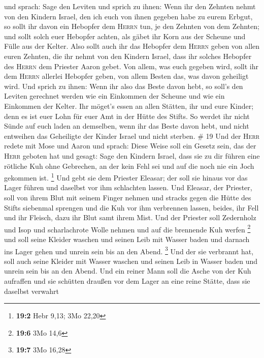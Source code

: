 und sprach:  Sage den Leviten und sprich zu ihnen: Wenn
ihr den Zehnten nehmt von den Kindern Israel, den ich euch von ihnen
gegeben habe zu eurem Erbgut, so sollt ihr davon ein Hebopfer dem
\textsc{Herrn} tun, je den Zehnten von dem Zehnten;  und
sollt solch euer Hebopfer achten, als gäbet ihr Korn aus der Scheune und
Fülle aus der Kelter.  Also sollt auch ihr das Hebopfer
dem \textsc{Herrn} geben von allen euren Zehnten, die ihr nehmt von den
Kindern Israel, dass ihr solches Hebopfer des \textsc{Herrn} dem
Priester Aaron gebet.  Von allem, was euch gegeben wird,
sollt ihr dem \textsc{Herrn} allerlei Hebopfer geben, von allem Besten
das, was davon geheiligt wird.  Und sprich zu ihnen: Wenn
ihr also das Beste davon hebt, so soll's den Leviten gerechnet werden
wie ein Einkommen der Scheune und wie ein Einkommen der Kelter.
 Ihr möget's essen an allen Stätten, ihr und eure Kinder;
denn es ist euer Lohn für euer Amt in der Hütte des Stifts.
 So werdet ihr nicht Sünde auf euch laden an demselben,
wenn ihr das Beste davon hebt, und nicht entweihen das Geheiligte der
Kinder Israel und nicht sterben. \# 19  Und der
\textsc{Herr} redete mit Mose und Aaron und sprach:  Diese
Weise soll ein Gesetz sein, das der \textsc{Herr} geboten hat und
gesagt: Sage den Kindern Israel, dass sie zu dir führen eine rötliche
Kuh ohne Gebrechen, an der kein Fehl sei und auf die noch nie ein Joch
gekommen ist. \footnote{\textbf{19:2} Hebr 9,13; 3Mo 22,20}
 Und gebt sie dem Priester Eleasar; der soll sie hinaus
vor das Lager führen und daselbst vor ihm schlachten lassen.
 Und Eleasar, der Priester, soll von ihrem Blut mit seinem
Finger nehmen und stracks gegen die Hütte des Stifts siebenmal sprengen
 und die Kuh vor ihm verbrennen lassen, beides, ihr Fell
und ihr Fleisch, dazu ihr Blut samt ihrem Mist.  Und der
Priester soll Zedernholz und Isop und scharlachrote Wolle nehmen und auf
die brennende Kuh werfen \footnote{\textbf{19:6} 3Mo 14,6}
 und soll seine Kleider waschen und seinen Leib mit Wasser
baden und darnach ins Lager gehen und unrein sein bis an den Abend.
\footnote{\textbf{19:7} 3Mo 16,28}  Und der sie verbrannt
hat, soll auch seine Kleider mit Wasser waschen und seinen Leib in
Wasser baden und unrein sein bis an den Abend.  Und ein
reiner Mann soll die Asche von der Kuh aufraffen und sie schütten
draußen vor dem Lager an eine reine Stätte, dass sie daselbst verwahrt
